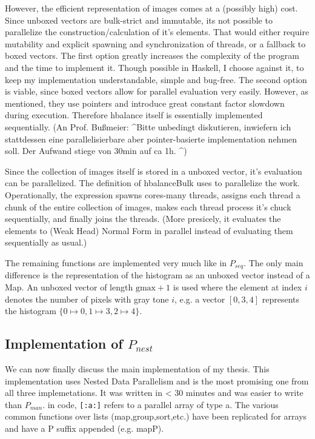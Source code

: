 \documentclass{article}
\newcommand{\seq}[0]{$P_{seq}$}
\newcommand{\man}[0]{$P_{man}$}
\newcommand{\ndpn}[0]{$P_{nest}$}
\newcommand{\gmax}[0]{\textrm{gmax}}
\begin{document}
      However, the efficient representation of images comes at a (possibly high) cost.
      Since unboxed vectors are bulk-strict and immutable,
      its not possible to parallelize the construction/calculation of it's elements.
      That would either require mutability and explicit spawning and synchronization of threads,
      or a fallback to boxed vectors.
      The first option greatly increases the complexity of the program
      and the time to implement it. Though possible in Haskell, I choose
      against it, to keep my implementation understandable, simple and bug-free.
      The second option is viable, since boxed vectors allow for parallel
      evaluation very easily. However, as mentioned, they use pointers and introduce great constant factor slowdown during execution.
      Therefore hbalance itself is essentially implemented sequentially.
      (An Prof. Bußmeier: \textasciicircum Bitte unbedingt diskutieren, inwiefern ich stattdessen eine parallelisierbare aber pointer-basierte implementation nehmen soll. Der Aufwand stiege von 30min auf ca 1h. \textasciicircum )
      
      Since the collection of images itself is stored in a unboxed vector,
      it's evaluation can be parallelized. The definition of hbalanceBulk
      uses \cite{Trinder1998Algorithm} to parallelize the work.
      Operationally, the expression spawns cores-many threads, assigns
      each thread a chunk of the entire collection of images,
      makes each thread process it's chuck sequentially, and finally joins the threads.
      (More presicely, it evaluates the elements to (Weak Head) Normal Form in parallel
      instead of evaluating them sequentially as usual.)
      
      The remaining functions are implemented very much like in \seq.
      The only main difference is the representation of the histogram as an unboxed vector instead of a Map.
      An unboxed vector of length $\gmax+1$ is used where the element at
      index $i$ denotes the number of pixels with gray tone $i$,
      e.g. a vector $ [0,3,4] $ represents the histogram $ \{0 \mapsto 0, 1 \mapsto 3, 2 \mapsto 4 \}$.
      
    \newpage
    
    \subsection{Implementation of \ndpn}
      We can now finally discuss the main implementation of my thesis. This
      implementation uses Nested Data Parallelism \cite{Harness2008} and
      is the most promising one from all three implemetations.
      It was written in < 30 minutes and was easier to write than \man.
      in code, \lstinline|[:a:]| refers to a parallel array of type a. The various common
      functions over lists (map,group,sort,etc.) have been replicated for arrays and have a P suffix appended (e.g. mapP).
\end{document}
